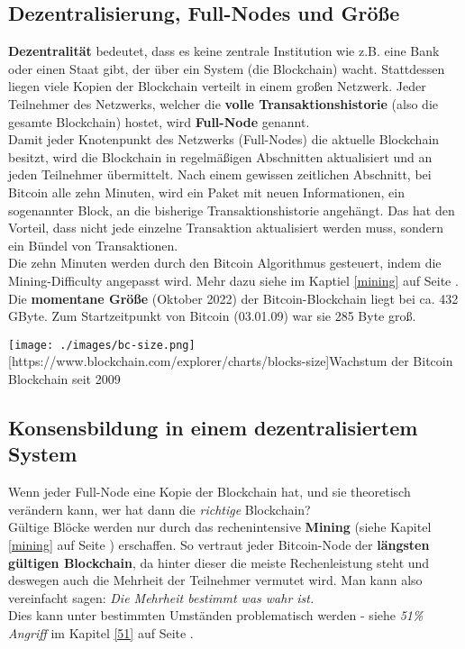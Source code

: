 \documentclass[10pt,a4paper,titlepage]{article}
\begin{document}
\subsection{Dezentralisierung, Full-Nodes und Größe}
\textbf{Dezentralität} bedeutet, dass es keine zentrale Institution wie  z.B. eine Bank oder einen Staat gibt, der über ein System (die Blockchain) wacht. Stattdessen liegen viele Kopien der Blockchain verteilt in einem großen Netzwerk. Jeder Teilnehmer des Netzwerks, welcher die \textbf{volle Transaktionshistorie} (also die gesamte Blockchain) hostet, wird \textbf{Full-Node} genannt.\\
Damit jeder Knotenpunkt des Netzwerks (Full-Nodes) die aktuelle Blockchain besitzt, wird die Blockchain in regelmäßigen Abschnitten aktualisiert und an jeden Teilnehmer übermittelt.
Nach einem gewissen zeitlichen Abschnitt, bei Bitcoin alle zehn Minuten, wird ein Paket mit neuen Informationen, ein sogenannter Block, an die bisherige Transaktionshistorie angehängt. Das hat den Vorteil, dass nicht jede einzelne Transaktion aktualisiert werden muss, sondern ein Bündel von Transaktionen.\\
Die zehn Minuten werden durch den Bitcoin Algorithmus gesteuert, indem die Mining-Difficulty angepasst wird. Mehr dazu siehe im Kaptiel \ref{mining} auf Seite \pageref{mining}.
Die \textbf{momentane Größe} (Oktober 2022) der Bitcoin-Blockchain liegt bei ca. 432 GByte. Zum Startzeitpunkt von Bitcoin (03.01.09) war sie 285 Byte groß. 
\begin{center}
\texttt{[image: ./images/bc-size.png]}
[https://www.blockchain.com/explorer/charts/blocks-size]{Wachstum der Bitcoin Blockchain seit 2009}
\end{center}

\subsection{Konsensbildung in einem dezentralisiertem System}
Wenn jeder Full-Node eine Kopie der Blockchain hat, und sie theoretisch verändern kann, wer hat dann die \textit{richtige} Blockchain?\\
Gültige Blöcke werden nur durch das rechenintensive \textbf{Mining} (siehe Kapitel \ref{mining} auf Seite \pageref{mining}) erschaffen. So vertraut jeder Bitcoin-Node der \textbf{längsten gültigen Blockchain}, da hinter dieser die meiste Rechenleistung steht und deswegen auch die Mehrheit der Teilnehmer vermutet wird. Man kann also vereinfacht sagen: \textit{Die Mehrheit bestimmt was wahr ist.} \\
Dies kann unter bestimmten Umständen problematisch werden - siehe \textit{51\% Angriff} im Kapitel \ref{51} auf Seite \pageref{51}.\\
\end{document}
